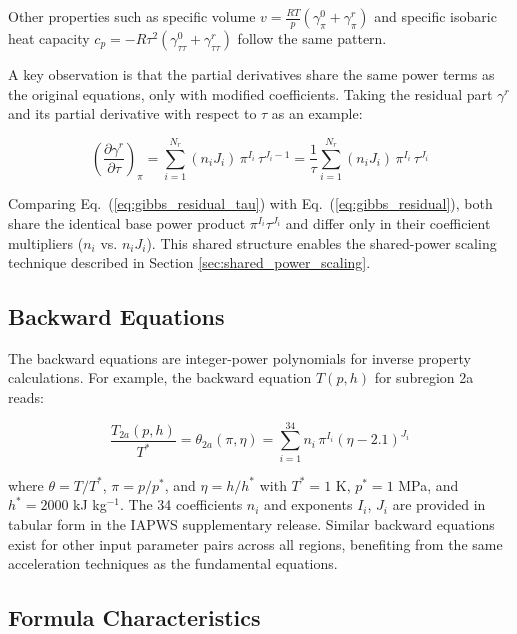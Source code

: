 \documentclass{article}
\begin{document}
Other properties such as specific volume $v = \frac{RT}{p}(\gamma^0_\pi + \gamma^r_\pi)$ and specific isobaric heat capacity $c_p = -R\tau^2(\gamma^0_{\tau\tau} + \gamma^r_{\tau\tau})$ follow the same pattern.

A key observation is that the partial derivatives share the same power terms as the original equations, only with modified coefficients. Taking the residual part $\gamma^r$ and its partial derivative with respect to $\tau$ as an example:

\begin{equation}\label{eq:gibbs_residual_tau}
\left( \frac{\partial \gamma^r}{\partial \tau} \right)_\pi = \sum_{i=1}^{N_r} (n_i J_i) \, \pi^{I_i} \, \tau^{J_i - 1} =\frac{1}{\tau} \sum_{i=1}^{N_r} (n_i J_i) \, \pi^{I_i} \, \tau^{J_i}
\end{equation}

Comparing Eq.~(\ref{eq:gibbs_residual_tau}) with Eq.~(\ref{eq:gibbs_residual}), both share the identical base power product $\pi^{I_i} \tau^{J_i}$ and differ only in their coefficient multipliers ($n_i$ vs. $n_i J_i$). This shared structure enables the shared-power scaling technique described in Section \ref{sec:shared_power_scaling}.

\subsection{Backward Equations}

The backward equations are integer-power polynomials for inverse property calculations. For example, the backward equation $T(p,h)$ for subregion 2a reads:

\begin{equation}\label{eq:backward_eq_reg2_ph_t_2a}
\frac{T_{2a}(p,h)}{T^*} = \theta_{2a}(\pi,\eta) = \sum_{i=1}^{34} n_i \, \pi^{I_i} (\eta - 2.1)^{J_i}
\end{equation}

where $\theta = T/T^*$, $\pi = p/p^*$, and $\eta = h/h^*$ with $T^* = 1$ K, $p^* = 1$ MPa, and $h^* = 2000$ kJ kg$^{-1}$. The 34 coefficients $n_i$ and exponents $I_i$, $J_i$ are provided in tabular form in the IAPWS supplementary release. Similar backward equations exist for other input parameter pairs across all regions, benefiting from the same acceleration techniques as the fundamental equations. 

\subsection{Formula Characteristics}
\end{document}
